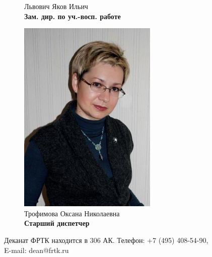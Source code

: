 \documentclass[14pt]{extarticle}
\begin{document}
\begin{figure}[h!]
\begin{subfigure}[b]{0.32\linewidth}
        \caption{Львович Яков Ильич \\ \textbf{Зам. дир. по уч.-восп. работе}}
    \end{subfigure}
    \begin{subfigure}[b]{0.32\linewidth}
        \centering
        \includegraphics[width=0.75\linewidth]{resources/trofim.jpg}
        \caption{Трофимова Оксана Николаевна \\ \textbf{Старший диспетчер}}
    \end{subfigure}
    \caption{Деканат ФРТК находится в 306 АК. Телефон: +7 (495) 408-54-90, E-mail: dean@frtk.ru}
\end{figure}
\clearpage
\end{document}
